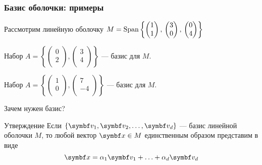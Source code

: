 \begin{frame}
\frametitle{Базис оболочки: примеры}

Рассмотрим линейную оболочку $M = \operatorname{Span}\left\{
\begin{pmatrix}
  1 \\
  1 \\
\end{pmatrix}, \, 
\begin{pmatrix}
  3 \\
  0 \\
\end{pmatrix},  \,
\begin{pmatrix}
  0 \\
  4 \\
\end{pmatrix}  
\right\}$

\pause

Набор $A = \left\{ \begin{pmatrix}
      0 \\
      2 \\
    \end{pmatrix}, \begin{pmatrix}
      3 \\
      4 \\
    \end{pmatrix} \right\}$ — базис для $M$.

\pause

Набор $A = \left\{ \begin{pmatrix}
  1 \\
  0 \\
\end{pmatrix}, \begin{pmatrix}
  7 \\
  -4 \\
\end{pmatrix} \right\}$ — базис для $M$.

\end{frame}



\begin{frame}{Зачем нужен базис?}

\begin{block}{Утверждение}
Если $\{\bv_1, \bv_2, \ldots, \bv_d\}$ — базис линейной оболочки $M$, 
то любой вектор $\bx\in M$ \alert{единственным} образом представим в виде 
\[
\bx  = \alpha_1 \bv_1 + \ldots + \alpha_d \bv_d
\]
\end{block}

\end{frame}


